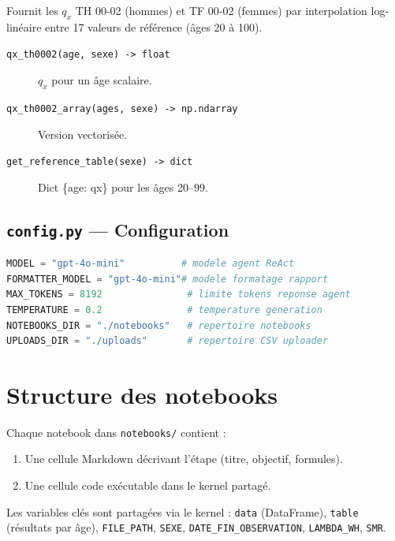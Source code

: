 \documentclass[11pt,a4paper]{article}
\begin{document}
Fournit les $q_x$ TH 00-02 (hommes) et TF 00-02 (femmes) par interpolation
log-linéaire entre 17 valeurs de référence (âges 20 à 100).

\begin{description}
  \item[\texttt{qx\_th0002(age, sexe) -> float}] $q_x$ pour un âge scalaire.
  \item[\texttt{qx\_th0002\_array(ages, sexe) -> np.ndarray}] Version vectorisée.
  \item[\texttt{get\_reference\_table(sexe) -> dict}] Dict \{age: qx\} pour les âges 20–99.
\end{description}

\subsection{\texttt{config.py} — Configuration}

\begin{lstlisting}[language=Python]
MODEL = "gpt-4o-mini"          # modele agent ReAct
FORMATTER_MODEL = "gpt-4o-mini"# modele formatage rapport
MAX_TOKENS = 8192               # limite tokens reponse agent
TEMPERATURE = 0.2               # temperature generation
NOTEBOOKS_DIR = "./notebooks"   # repertoire notebooks
UPLOADS_DIR = "./uploads"       # repertoire CSV uploader
\end{lstlisting}

\section{Structure des notebooks}

Chaque notebook dans \texttt{notebooks/} contient :
\begin{enumerate}
  \item Une cellule Markdown décrivant l'étape (titre, objectif, formules).
  \item Une cellule code exécutable dans le kernel partagé.
\end{enumerate}

Les variables clés sont partagées via le kernel : \texttt{data} (DataFrame),
\texttt{table} (résultats par âge), \texttt{FILE\_PATH}, \texttt{SEXE},
\texttt{DATE\_FIN\_OBSERVATION}, \texttt{LAMBDA\_WH}, \texttt{SMR}.
\end{document}
